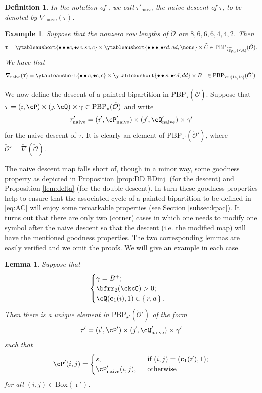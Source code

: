 \documentclass[11pt,a4paper]{amsart}
\newcommand{\CO}{{\mathcal {O}}}
\def\DD{\nabla}
\numberwithin{equation}{section}
\newtheorem{lem}[thm]{Lemma}
\newtheorem{defn}[thm]{Definition}
\newtheorem{eg}[thm]{Example}
\theoremstyle{remark}
\def\DDn{\DD_{\mathrm{naive}}}
\let\ytb=\ytableaushort
\def\BOX{\mathrm{Box}}
\def\PBP{\mathrm{PBP}}
\begin{document}
 \begin{defn}
 In the notation of  ,
 we call $\tau'_\mathrm{naive}$ the naive descent of $\tau$, to be denoted by $\DDn(\tau)$.
 \end{defn}


\begin{eg}
 Suppose that the nonzero row lengths of $\check \CO$ are $8,6,6,6,4,4,2$. Then
    \[
     \uptau = \ytb{\bullet\bullet\bullet {c},\bullet {s} {c},{s} {c},{c}}
    \times \ytb{\bullet\bullet\bullet ,\bullet {r} {d},{d}{d}, \none}
    \times \widetilde C \in \PBP_{\widetilde{\Sp}_{36}(\bR)}(\check \CO).
    \]
  We have that
   \[
    \nabla_{\mathrm{naive}}(\uptau) =\ytb{\bullet\bullet{c} ,\bullet{c},{c} }
    \times  \ytb{\bullet\bullet {s} ,\bullet {r} {d},{d}{d}}\times B^- \in \PBP_{\rO(14,15)}(\check \CO').
    \]
\end{eg}


We now define the descent of a painted bipartition in $\mathrm{PBP}_\star(\check \CO)$.
Suppose that
$
\tau=(\imath,\cP)\times(\jmath,\cQ)\times \gamma \in  \mathrm{PBP}_\star(\check \CO)
$
and write
\[
  \tau'_{\mathrm{naive}}=(\imath', \cP'_{\mathrm{naive}})\times (\jmath', \cQ'_{\mathrm{naive}})\times \gamma '
\]
for the naive descent of $\tau$. It is clearly an element of $  \mathrm{PBP}_{\star'}(\check \CO')$, where $\check \CO'=\check \nabla(\check \CO)$.

The naive descent map falls short of, though in a minor way, some goodness property as depicted in Proposition \ref{prop:DD.BDinj} (for the descent) and Proposition \ref{lem:delta} (for the double descent). In turn these goodness properties help to ensure that the associated cycle of a painted bipartition to be defined in \eqref{eq:AC} will enjoy some remarkable properties (see Section \ref{subsec:kpac}).  It turns out that there are only two (corner) cases in which one needs to modify one symbol after the naive descent so that the descent (i.e. the modified map) will have the mentioned goodness properties. The two corresponding lemmas are easily verified and we omit the proofs. We will give an example in each case.


\begin{lem}\label{descb1}
  Suppose that
\[  \begin{cases}
 \gamma = B^+; & \\
 \bfrr_2(\ckcO)>0; & \\
 \cQ(\mathbf c_1(\imath),1)\in \set{r,d}.
\end{cases}
\]
 Then there is a unique element in $\mathrm{PBP}_{\star'}(\check \CO')$ of the form
  \[
      \tau'=(\imath', \cP')\times (\jmath', \cQ'_{\mathrm{naive}} )\times \gamma '
  \]
 such that
\[
\cP'(i,j) = \begin{cases}
  s, & \ \text{ if $(i,j) = (\mathbf c_1(\imath'),1)$;}\\
  \cP'_{\mathrm{naive}}(i,j), & \ \text{ otherwise}
  \end{cases}
  \]
 for all $(i,j)\in \BOX(\imath')$.
\end{lem}
\end{document}
